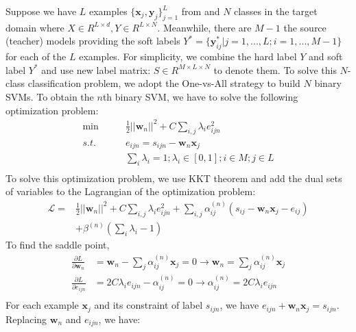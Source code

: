 Suppose we have $L$ examples $\{\textbf{x}_j,\textbf{y}_j\}_{j=1}^L$ from and $N$ classes in the target domain where $X\in R^{L\times d}, Y\in R^{L\times N}$. Meanwhile, there are $M-1$ the source (teacher) models providing the soft labels $Y^*=\{\textbf{y}^*_{ij}|j=1,...,L;i=1,...,M-1\}$ for each of the $L$ examples.
For simplicity, we combine the hard label $Y$ and soft label $Y^*$ and use new label matrix: $S \in R^{M\times L \times N}$ to denote them. To solve this $N$-class classification problem, we adopt the One-vs-All strategy to build $N$ binary SVMs.
To obtain the $n$th binary SVM, we have to solve the following optimization problem: 
\begin{equation}\label{eq:multi-distill}
\begin{aligned}
\min \qquad & \frac{1}{2}{|| \textbf{w}_n ||^2} + C\sum_{i,j} \lambda_i{e_{ijn}^2} \\
s.t.\qquad& e_{ijn} = s_{ijn} - \textbf{w}_n\textbf{x}_j\\
& \sum_i\lambda_i=1; \lambda_i \in [0,1]; i\in M;  j\in L\\
\end{aligned}  
\end{equation}
To solve this optimization problem, we use KKT theorem \cite{cristianini2000introduction} and add the dual sets of variables to the Lagrangian of the optimization problem:
\begin{equation}
\begin{aligned}
\mathcal{L}=&\frac{1}{2}{|| \textbf{w}_n ||^2} + C\sum_{i,j} \lambda_i{e_{ijn}^2}+\sum_{i,j}\alpha^{(n)}_{ij}\left(s_{ij} - \textbf{w}_n\textbf{x}_j-e_{ij}\right)\\&+\beta^{(n)}\left(\sum_i\lambda_i-1\right)
\end{aligned}
\end{equation}
To find the saddle point, 
\begin{equation}
\begin{aligned}
\frac{{\partial L}}{{\partial \textbf{w}_n}}& = \textbf{w}_n - \sum_{j}\alpha^{(n)}_{ij} {\textbf{x}_j}=0 \rightarrow \textbf{w}_n = \sum_{j}\alpha^{(n)}_{ij} {\textbf{x}_j}\\
\frac{{\partial L}}{{\partial {e_{ijn}}}} & = 2C\lambda_i {e_{ijn}} - {\alpha^{(n)} _{ij}}=0 \rightarrow \alpha^{(n)}_{ij} = 2C\lambda_i {e_{ijn}}\\
\end{aligned}
\end{equation}
For each example $\textbf{x}_j$ and its constraint of label $s_{ijn}$, we have $e_{ijn}  + \textbf{w}_n\textbf{x}_j= s_{ijn}$. Replacing $\textbf{w}_n$ and $e_{ijn}$,  we have:  
